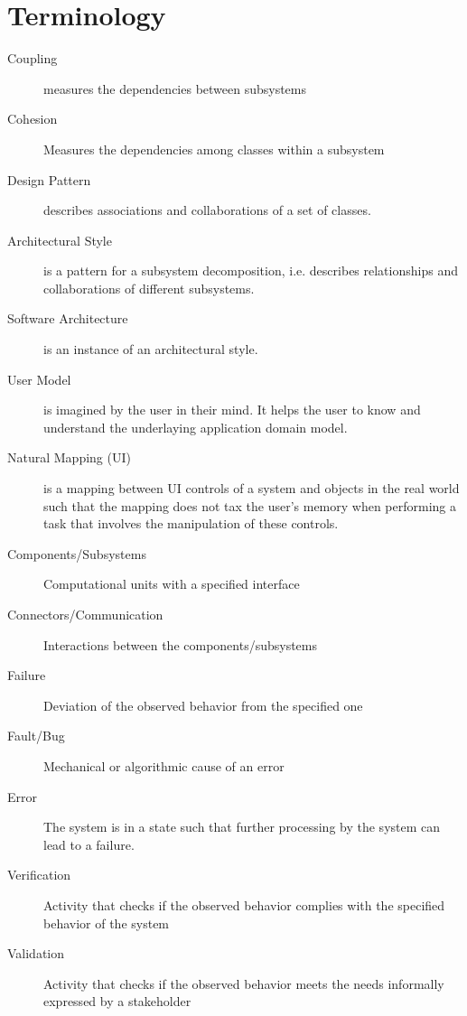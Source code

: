 
\section{Terminology}
\begin{description}
  \item[Coupling] measures the dependencies between subsystems

  \item[Cohesion] Measures the dependencies among classes within a subsystem

  \item[Design Pattern] describes associations and collaborations of a set of classes.

  \item[Architectural Style] is a pattern for a subsystem decomposition, i.e. describes relationships and collaborations of different subsystems.

  \item[Software Architecture] is an instance of an architectural style.

  \item[User Model] is imagined by the user in their mind.
  It helps the user to know and understand the underlaying application domain model.

  \item[Natural Mapping (UI)] is a mapping between UI controls of a system and objects in the real world such that the mapping does not tax the user's memory when performing a task that involves the manipulation of these controls.

  \item[Components/Subsystems] Computational units with a specified interface

  \item[Connectors/Communication] Interactions between the components/subsystems

  \item[Failure] Deviation of the observed behavior from the specified one

  \item[Fault/Bug] Mechanical or algorithmic cause of an error

  \item[Error] The system is in a state such that further processing by the system can lead to a failure.

  \item[Verification] Activity that checks if the observed behavior complies with the specified behavior of the system

  \item[Validation] Activity that checks if the observed behavior meets the needs informally expressed by a stakeholder
\end{description}
